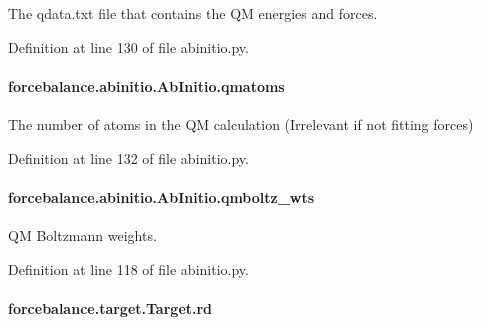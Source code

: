 The qdata.\-txt file that contains the Q\-M energies and forces. 



Definition at line 130 of file abinitio.\-py.

\hypertarget{classforcebalance_1_1abinitio_1_1AbInitio_af0760b8d33ce9dd044ccbe68fba7a1be}{
\paragraph[{qmatoms}]{\setlength{\rightskip}{0pt plus 5cm}forcebalance.\-abinitio.\-Ab\-Initio.\-qmatoms\hspace{0.3cm}{\ttfamily [inherited]}}}\label{classforcebalance_1_1abinitio_1_1AbInitio_af0760b8d33ce9dd044ccbe68fba7a1be}


The number of atoms in the Q\-M calculation (Irrelevant if not fitting forces) 



Definition at line 132 of file abinitio.\-py.

\hypertarget{classforcebalance_1_1abinitio_1_1AbInitio_a06ec6b12d81791ca94f599f41e56335a}{
\paragraph[{qmboltz\-\_\-wts}]{\setlength{\rightskip}{0pt plus 5cm}forcebalance.\-abinitio.\-Ab\-Initio.\-qmboltz\-\_\-wts\hspace{0.3cm}{\ttfamily [inherited]}}}\label{classforcebalance_1_1abinitio_1_1AbInitio_a06ec6b12d81791ca94f599f41e56335a}


Q\-M Boltzmann weights. 



Definition at line 118 of file abinitio.\-py.

\hypertarget{classforcebalance_1_1target_1_1Target_a4edb69fbde792e9f2f27e54b7c978c8e}{
\paragraph[{rd}]{\setlength{\rightskip}{0pt plus 5cm}forcebalance.\-target.\-Target.\-rd\hspace{0.3cm}{\ttfamily [inherited]}}}\label{classforcebalance_1_1target_1_1Target_a4edb69fbde792e9f2f27e54b7c978c8e}


